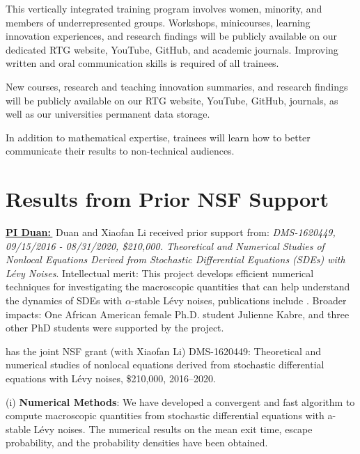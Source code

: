 \documentclass[11pt]{article}
\begin{document}
This vertically integrated training program 
  involves women, minority, and members of underrepresented groups. Workshops, minicourses, learning innovation experiences, and research findings will be publicly available on our dedicated RTG website, YouTube, GitHub, and academic journals. Improving written and oral communication skills is required of all trainees.   
 

New courses, research and teaching innovation summaries, and research findings will be publicly available on our RTG website, YouTube, GitHub,
journals, as well as our universities permanent data storage.  
 
 In addition to mathematical expertise, trainees will learn how to better   communicate their results to non-technical audiences.
 
 
\section{Results from Prior NSF Support}

\noindent\underline{{\bf PI Duan:\,}} Duan and Xiaofan Li received prior support from:
{\it DMS-1620449, 09/15/2016 - 08/31/2020, \$210,000. Theoretical and Numerical Studies of Nonlocal Equations Derived from Stochastic Differential Equations (SDEs) with L\'evy Noises}. Intellectual merit: This project develops efficient numerical techniques for investigating the macroscopic quantities that can help understand the dynamics of SDEs
with $\alpha$-stable L\'evy noises, publications include \cite{Chen, WuFuDuan2019, YangDuan2020,ZhangZhuanDuan,WCDKL,CAI2019166,Cai_2017,IJNAM-17-151}. Broader impacts: One African American female Ph.D. student Julienne Kabre, and three other PhD students were supported  by the project. 
 
 \medskip   
 
 has the joint NSF grant (with Xiaofan Li)  DMS-1620449: Theoretical and numerical studies of nonlocal equations derived from stochastic differential equations with L\'evy noises, \$210,000, 2016--2020.



(i)  \textbf{Numerical Methods}:
    We have developed a convergent and fast algorithm to compute macroscopic quantities from stochastic differential equations  with a-stable L\'evy noises. The numerical results on the mean   exit time, escape probability,  and the probability densities have been obtained.
\end{document}
